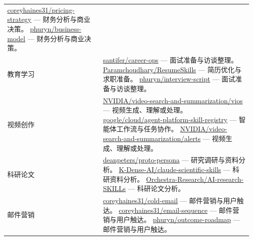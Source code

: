 \documentclass[UTF8,a4paper,12pt]{ctexart}
\begin{document}
\begin{longtable}{p{2.6cm} p{12cm}}
  \newline \href{https://github.com/coreyhaines31/marketingskills/tree/main/skills/pricing-strategy}{coreyhaines31/pricing-strategy} — 财务分析与商业决策。
  \newline \href{https://github.com/phuryn/pm-skills/tree/main/pm-product-strategy/skills/business-model}{phuryn/business-model} — 财务分析与商业决策。\\
\addlinespace
教育学习 & \href{https://github.com/santifer/career-ops}{santifer/career-ops} — 面试准备与访谈整理。
  \newline \href{https://github.com/Paramchoudhary/ResumeSkills}{Paramchoudhary/ResumeSkills} — 简历优化与求职准备。
  \newline \href{https://github.com/phuryn/pm-skills/tree/main/pm-product-discovery/skills/interview-script}{phuryn/interview-script} — 面试准备与访谈整理。\\
\addlinespace
视频创作 & \href{https://github.com/NVIDIA/skills/tree/main/skills/video-search-and-summarization/vios}{NVIDIA/video-search-and-summarization/vios} — 视频生成、理解或处理。
  \newline \href{https://github.com/google/skills/tree/main/skills/cloud/agent-platform-skill-registry}{google/cloud/agent-platform-skill-registry} — 智能体工作流与任务协作。
  \newline \href{https://github.com/NVIDIA/skills/tree/main/skills/video-search-and-summarization/alerts}{NVIDIA/video-search-and-summarization/alerts} — 视频生成、理解或处理。\\
\addlinespace
科研论文 & \href{https://github.com/deanpeters/Product-Manager-Skills/tree/main/skills/proto-persona}{deanpeters/proto-persona} — 研究调研与资料分析。
  \newline \href{https://github.com/K-Dense-AI/claude-scientific-skills}{K-Dense-AI/claude-scientific-skills} — 科研资料分析。
  \newline \href{https://github.com/Orchestra-Research/AI-research-SKILLs}{Orchestra-Research/AI-research-SKILLs} — 科研论文分析。\\
\addlinespace
邮件营销 & \href{https://github.com/coreyhaines31/marketingskills/tree/main/skills/cold-email}{coreyhaines31/cold-email} — 邮件营销与用户触达。
  \newline \href{https://github.com/coreyhaines31/marketingskills/tree/main/skills/email-sequence}{coreyhaines31/email-sequence} — 邮件营销与用户触达。
  \newline \href{https://github.com/phuryn/pm-skills/tree/main/pm-execution/skills/outcome-roadmap}{phuryn/outcome-roadmap} — 邮件营销与用户触达。\\

\end{longtable}
\end{document}
